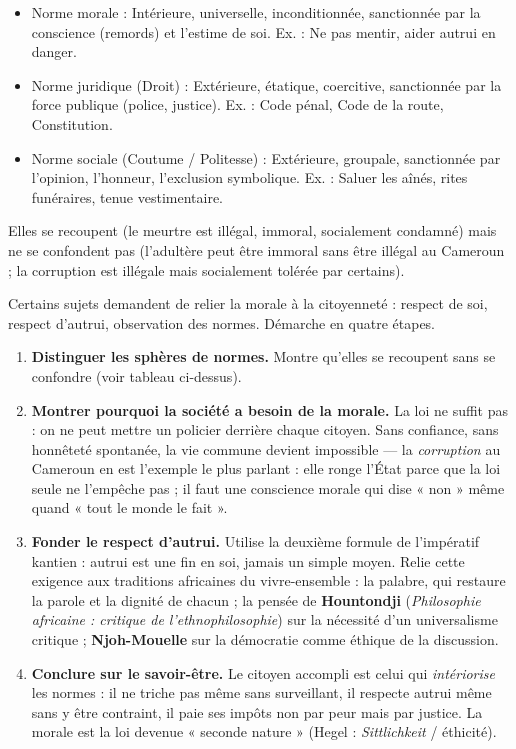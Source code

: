 \documentclass[11pt]{article}
\newcommand{\cle}[1]{{\popxbold\color{popdark}#1}}
\begin{document}
\begin{definition}
\begin{itemize}
\item \cle{Norme morale} : Intérieure, universelle, inconditionnée, sanctionnée par la conscience (remords) et l'estime de soi. Ex. : Ne pas mentir, aider autrui en danger.
\item \cle{Norme juridique (Droit)} : Extérieure, étatique, coercitive, sanctionnée par la force publique (police, justice). Ex. : Code pénal, Code de la route, Constitution.
\item \cle{Norme sociale (Coutume / Politesse)} : Extérieure, groupale, sanctionnée par l'opinion, l'honneur, l'exclusion symbolique. Ex. : Saluer les aînés, rites funéraires, tenue vestimentaire.
\end{itemize}
Elles se recoupent (le meurtre est illégal, immoral, socialement condamné) mais ne se confondent pas (l'adultère peut être immoral sans être illégal au Cameroun ; la corruption est illégale mais socialement tolérée par certains).
\end{definition}

\begin{methode}
Certains sujets demandent de relier la morale à la citoyenneté : respect de soi, respect d'autrui, observation des normes. Démarche en quatre étapes.
\begin{enumerate}
\item \textbf{Distinguer les sphères de normes.} Montre qu'elles se recoupent sans se confondre (voir tableau ci-dessus).
\item \textbf{Montrer pourquoi la société a besoin de la morale.} La loi ne suffit pas : on ne peut mettre un policier derrière chaque citoyen. Sans confiance, sans honnêteté spontanée, la vie commune devient impossible — la \emph{corruption} au Cameroun en est l'exemple le plus parlant : elle ronge l'État parce que la loi seule ne l'empêche pas ; il faut une conscience morale qui dise « non » même quand « tout le monde le fait ».
\item \textbf{Fonder le respect d'autrui.} Utilise la deuxième formule de l'impératif kantien : autrui est une fin en soi, jamais un simple moyen. Relie cette exigence aux traditions africaines du vivre-ensemble : la palabre, qui restaure la parole et la dignité de chacun ; la pensée de \textbf{Hountondji} (\emph{Philosophie africaine : critique de l'ethnophilosophie}) sur la nécessité d'un universalisme critique ; \textbf{Njoh-Mouelle} sur la démocratie comme éthique de la discussion.
\item \textbf{Conclure sur le savoir-être.} Le citoyen accompli est celui qui \emph{intériorise} les normes : il ne triche pas même sans surveillant, il respecte autrui même sans y être contraint, il paie ses impôts non par peur mais par justice. La morale est la loi devenue « seconde nature » (Hegel : \emph{Sittlichkeit} / éthicité).
\end{enumerate}
\end{methode}
\end{document}

